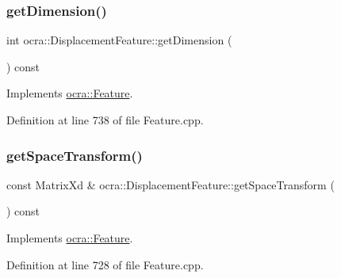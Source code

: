 \hypertarget{classocra_1_1DisplacementFeature_a5d6548c921c2ce61374d3f76114b7881}{}\label{classocra_1_1DisplacementFeature_a5d6548c921c2ce61374d3f76114b7881} 
\subsubsection{\texorpdfstring{get\+Dimension()}{getDimension()}}
{\footnotesize\ttfamily int ocra\+::\+Displacement\+Feature\+::get\+Dimension (\begin{DoxyParamCaption}{ }\end{DoxyParamCaption}) const\hspace{0.3cm}{\ttfamily [virtual]}}



Implements \hyperlink{classocra_1_1Feature_aeda4c2a5ffe638c3de30f8b91a11450e}{ocra\+::\+Feature}.



Definition at line 738 of file Feature.\+cpp.

\hypertarget{classocra_1_1DisplacementFeature_ad27f4aa83abea99ef893de6043b0bf68}{}\label{classocra_1_1DisplacementFeature_ad27f4aa83abea99ef893de6043b0bf68} 
\subsubsection{\texorpdfstring{get\+Space\+Transform()}{getSpaceTransform()}}
{\footnotesize\ttfamily const Matrix\+Xd \& ocra\+::\+Displacement\+Feature\+::get\+Space\+Transform (\begin{DoxyParamCaption}{ }\end{DoxyParamCaption}) const\hspace{0.3cm}{\ttfamily [virtual]}}



Implements \hyperlink{classocra_1_1Feature_a77eb324fb4da91fd50d0e761d2453ff3}{ocra\+::\+Feature}.



Definition at line 728 of file Feature.\+cpp.

\hypertarget{classocra_1_1DisplacementFeature_a3940d5c27ee1845c65f4be6ad3a27e50}{}\label{classocra_1_1DisplacementFeature_a3940d5c27ee1845c65f4be6ad3a27e50} 
